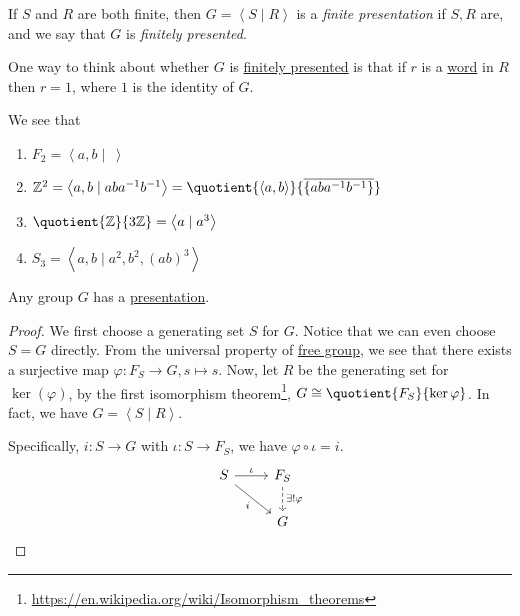 \begin{definition}\label{def:finite-presentation}
	If \(S\) and \(R\) are both finite, then \(G = \left< S \mid R \right> \) is a \emph{finite presentation} if \(S, R\) are, and we say that \(G\) is \emph{finitely presented}.
\end{definition}
\begin{note}
	One way to think about whether \(G\) is \hyperref[def:finite-presentation]{finitely presented} is that if \(r\) is a
	\hyperref[def:word]{word} in \(R\) then \(r = 1\), where \(1\) is the identity of \(G\).
\end{note}

\begin{eg}
	We see that
	\begin{enumerate}
		\item \(F_2 = \left< a, b \mid\ \right> \)
		\item \(\mathbb{\MakeUppercase{z}} ^2 = \left< a, b \mid aba^{-1} b^{-1}  \right> = \quotient{\left< a, b \right> }{\overline{\{aba^{-1} b^{-1} \}}} \)
		\item \(\quotient{\mathbb{\MakeUppercase{z}}}{3\mathbb{\MakeUppercase{z}}} = \left< a \mid a^3 \right> \)
		\item \(S_3 = \left< a, b \mid a^2, b^2, (ab)^3 \right> \)
	\end{enumerate}
\end{eg}

\begin{theorem}
	Any group \(G\) has a \hyperref[def:group-presentation]{presentation}.
\end{theorem}
\begin{proof}
	We first choose a generating set \(S\) for \(G\). Notice that we can even choose \(S = G\) directly. From the universal property of \hyperref[def:free-group]{free group},
	we see that there exists a surjective map \(\varphi \colon F_S \to G, s \mapsto s\). Now, let \(R\) be the generating set for \(\ker (\varphi) \),
	by the first isomorphism theorem\footnote{\url{https://en.wikipedia.org/wiki/Isomorphism_theorems}}, \(G\cong \quotient{F_S}{\ker  \varphi}\).
	In fact, we have \(G = \left< S \mid R \right> \).

	Specifically, \(i\colon S\to G\) with \(\iota \colon S\to F_S\), we have \(\varphi \circ \iota = i\).
	\[
		\begin{tikzcd}
			S \ar[rd, "i"']\ar[r, "\iota "] & F_S\ar[d, dashed, "\exists !\varphi"]\\
			& G
		\end{tikzcd}
	\]
\end{proof}

